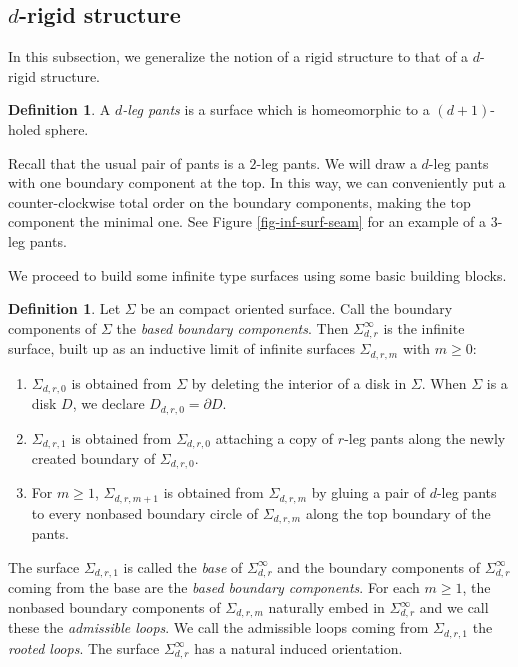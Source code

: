 \documentclass[11pt, a4paper]{amsart}
\theoremstyle{definition}
\newtheorem{defn}[thm]{Definition} %
\begin{document}
\subsection{$d$-rigid structure} In this subsection, we generalize the notion of a rigid structure to that of a $d$-rigid structure. 

\begin{defn}
A {\em  $d$-leg pants} is a surface which is homeomorphic to a $(d+1)$-holed sphere.  
\end{defn}

Recall that the usual pair of pants is a $2$-leg pants. We will draw a $d$-leg pants with one boundary component at the top. In this way, we can conveniently put a counter-clockwise total order on the boundary components, making the top component the minimal one. See Figure \ref{fig-inf-surf-seam} for an example of a $3$-leg pants. 


We proceed to build some infinite type surfaces using some basic building blocks.

\begin{defn}\label{defn-inf-surf}
Let $\Sigma$ be an compact oriented surface. Call the boundary components of $\Sigma$ the \emph{based boundary components}. Then $\Sigma^{\infty}_{d,r}$ is the infinite surface, built up as an inductive limit of infinite surfaces $\Sigma_{d,r,m}$ with $m\geq 0$:
\begin{enumerate}
    \item $\Sigma_{d,r,0}$ is obtained from $\Sigma$ by deleting the interior of a  disk in $\Sigma$.  When $\Sigma$ is a disk $D$, we declare $D_{d,r,0} =\partial D$.
    \item  $\Sigma_{d,r,1}$ is obtained from $\Sigma_{d,r,0}$ attaching a copy of $r$-leg pants along the newly created boundary of $\Sigma_{d,r,0}$.
    \item For $m\geq 1$, $\Sigma_{d,r,m+1}$ is obtained from $\Sigma_{d,r,m}$ by gluing  a pair of $d$-leg pants to  every nonbased boundary circle of $\Sigma_{d,r,m}$ along the top boundary of the pants.
\end{enumerate}
The surface $\Sigma_{d,r,1}$ is called the \emph{base} of $\Sigma^{\infty}_{d,r}$ and the boundary components of  $\Sigma^{\infty}_{d,r}$ coming from the base are the \emph{based boundary components}. For each $m \geq 1$, the  nonbased boundary components of $\Sigma_{d,r,m}$ naturally embed in $\Sigma^{\infty}_{d,r}$ and we call these the \emph{admissible loops}. We call the admissible loops coming from $\Sigma_{d,r,1}$ the \emph{rooted loops}. The surface $\Sigma^{\infty}_{d,r}$ has a natural induced orientation.
\end{defn}
\end{document}
